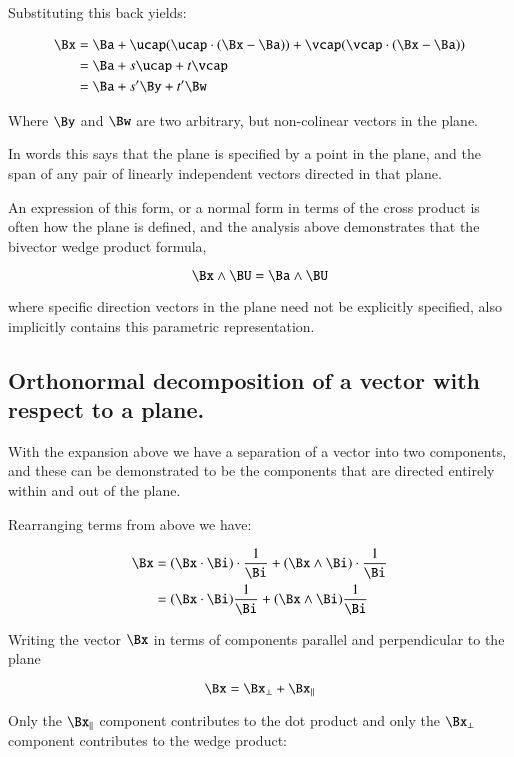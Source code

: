 Substituting this back yields:

\begin{align*}
\Bx 
&= \Ba + \ucap (\ucap \cdot (\Bx - \Ba)) + \vcap (\vcap \cdot (\Bx - \Ba)) \\
&= \Ba + s \ucap + t \vcap \\
&= \Ba + s' \By + t' \Bw \\
\end{align*}

Where $\By$ and $\Bw$ are two arbitrary, but non-colinear vectors 
in the plane.

In words this says that the plane is specified by a point in the plane,
and the span of any pair of linearly independent vectors directed in that plane.

An expression of this form, or a normal form in terms of the cross product
is often how the plane is defined, and the analysis above demonstrates
that the bivector wedge product formula,

\[
\Bx \wedge \BU = \Ba \wedge \BU
\]

where specific direction vectors in the plane need not be explicitly specified,
also implicitly contains this parametric representation.

\subsection{Orthonormal decomposition of a vector with respect to a plane. }

With the expansion above we have a separation of a vector into two
components, and these can be demonstrated to be the components that are
directed entirely within and out of the plane.

Rearranging terms from above we have:

\begin{align*}
\Bx 
&= 
(\Bx \cdot \Bi) \cdot \frac{1}{\Bi} + (\Bx \wedge \Bi) \cdot \frac{1}{\Bi} \\
&= 
(\Bx \cdot \Bi) \frac{1}{\Bi} + (\Bx \wedge \Bi) \frac{1}{\Bi} \\
\end{align*}

Writing the vector $\Bx$ in terms of components parallel and perpendicular
to the plane

\[
\Bx = \Bx_{\perp} + \Bx_{\parallel}
\]

Only the $\Bx_{\parallel}$ component contributes to the dot product
and only the $\Bx_{\perp}$ component contributes to the wedge product:

